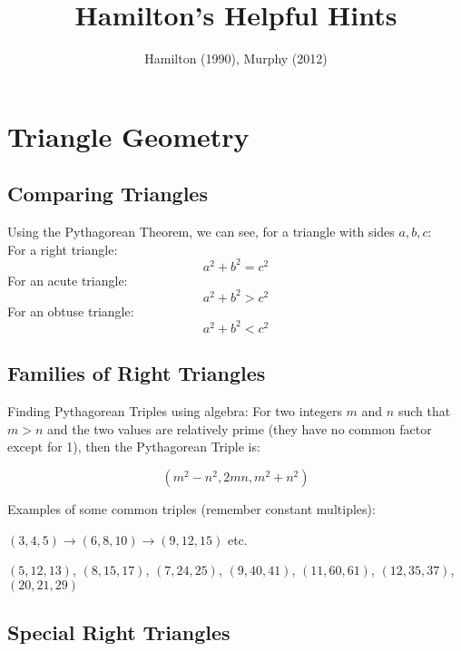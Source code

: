 \documentclass[final, letterpaper, 12pt]{article}
\date{}
\title{Hamilton's Helpful Hints}
\author{Hamilton (1990), Murphy (2012)}
\begin{document}
\maketitle
	
\section{Triangle Geometry}	
	 \subsection{Comparing Triangles}\label{sec: using the Pythagorean Theorem}
		Using the Pythagorean Theorem, we can see, for a triangle with sides $a, b, c$: \\
		For a right triangle:
		\begin{equation}
		 	a^2+b^2 = c^2
		\end{equation}
		For an acute triangle:
		\begin{equation}
			a^2+b^2 > c^2
		\end{equation}
		For an obtuse triangle: 
		\begin{equation}
			a^2+b^2 < c^2
		\end{equation}
	 
	 \subsection{Families of Right Triangles}\label{sec: families of right triangles}
		Finding Pythagorean Triples using algebra: For two integers $m$ and $n$ such that $m > n$ and the two values are relatively prime (they have no common factor except for 1), then the Pythagorean Triple is:
		
		\begin{equation}\label{method of forming Pythagorean Triples}
			(m^2 - n^2, 2mn, m^2 + n^2)
		\end{equation}
		
		Examples of some common triples (remember constant multiples):
		
		$(3, 4, 5) {\rightarrow} (6, 8, 10) {\rightarrow} (9, 12, 15)$ etc.
		
		$(5, 12, 13)$, $(8, 15, 17)$, $(7, 24, 25)$, $(9, 40, 41)$, $(11, 60, 61)$, $(12, 35, 37)$, $(20, 21, 29)$
	
	\subsection{Special Right Triangles}\label{sec: patterns in special right triangles}
	
\end{document}
